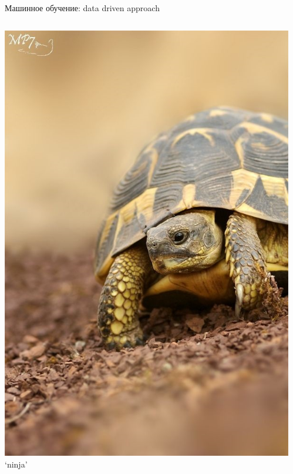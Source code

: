 \documentclass[aspectratio=169, professionalfonts]{beamer}
\begin{document}
\begin{frame}{Машинное обучение: data driven approach}
\begin{columns}
\begin{column}{.1\linewidth}
            \includegraphics[width=\linewidth]{figures/fig31-dataset-sample.jpg}
            `ninja'
        \end{column}
        \begin{column}{.1\linewidth}
            \centering

\end{column}
\end{columns}
\end{frame}
\end{document}
